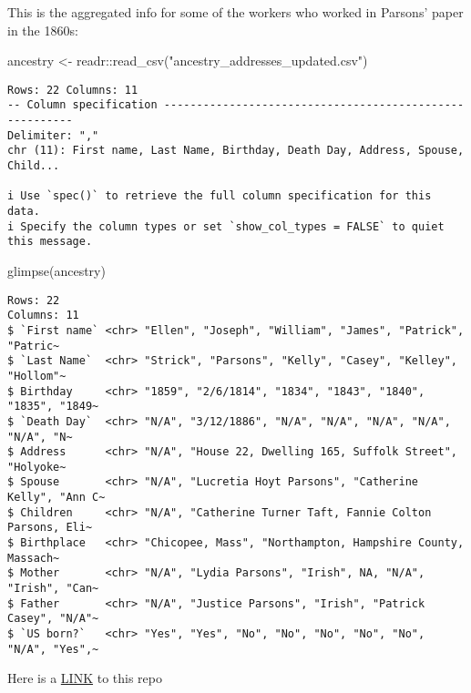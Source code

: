 \documentclass[
  letterpaper,
  DIV=11,
  numbers=noendperiod]{scrartcl}
\newenvironment{Shaded}{\begin{snugshade}}{\end{snugshade}}
\newcommand{\FunctionTok}[1]{\textcolor[rgb]{0.28,0.35,0.67}{#1}}
\newcommand{\NormalTok}[1]{\textcolor[rgb]{0.00,0.23,0.31}{#1}}
\newcommand{\OtherTok}[1]{\textcolor[rgb]{0.00,0.23,0.31}{#1}}
\newcommand{\SpecialCharTok}[1]{\textcolor[rgb]{0.37,0.37,0.37}{#1}}
\newcommand{\StringTok}[1]{\textcolor[rgb]{0.13,0.47,0.30}{#1}}
\begin{document}
This is the aggregated info for some of the workers who worked in
Parsons' paper in the 1860s:

\begin{Shaded}
\begin{Highlighting}[]
\NormalTok{ancestry }\OtherTok{\textless{}{-}}\NormalTok{ readr}\SpecialCharTok{::}\FunctionTok{read\_csv}\NormalTok{(}\StringTok{"ancestry\_addresses\_updated.csv"}\NormalTok{)}
\end{Highlighting}
\end{Shaded}

\begin{verbatim}
Rows: 22 Columns: 11
-- Column specification --------------------------------------------------------
Delimiter: ","
chr (11): First name, Last Name, Birthday, Death Day, Address, Spouse, Child...

i Use `spec()` to retrieve the full column specification for this data.
i Specify the column types or set `show_col_types = FALSE` to quiet this message.
\end{verbatim}

\begin{Shaded}
\begin{Highlighting}[]
\FunctionTok{glimpse}\NormalTok{(ancestry)}
\end{Highlighting}
\end{Shaded}

\begin{verbatim}
Rows: 22
Columns: 11
$ `First name` <chr> "Ellen", "Joseph", "William", "James", "Patrick", "Patric~
$ `Last Name`  <chr> "Strick", "Parsons", "Kelly", "Casey", "Kelley", "Hollom"~
$ Birthday     <chr> "1859", "2/6/1814", "1834", "1843", "1840", "1835", "1849~
$ `Death Day`  <chr> "N/A", "3/12/1886", "N/A", "N/A", "N/A", "N/A", "N/A", "N~
$ Address      <chr> "N/A", "House 22, Dwelling 165, Suffolk Street", "Holyoke~
$ Spouse       <chr> "N/A", "Lucretia Hoyt Parsons", "Catherine Kelly", "Ann C~
$ Children     <chr> "N/A", "Catherine Turner Taft, Fannie Colton Parsons, Eli~
$ Birthplace   <chr> "Chicopee, Mass", "Northampton, Hampshire County, Massach~
$ Mother       <chr> "N/A", "Lydia Parsons", "Irish", NA, "N/A", "Irish", "Can~
$ Father       <chr> "N/A", "Justice Parsons", "Irish", "Patrick Casey", "N/A"~
$ `US born?`   <chr> "Yes", "Yes", "No", "No", "No", "No", "No", "N/A", "Yes",~
\end{verbatim}

Here is a
\href{https://github.com/STAT210-S23/Parsons_Paper_Register}{LINK} to
this repo
\end{document}
